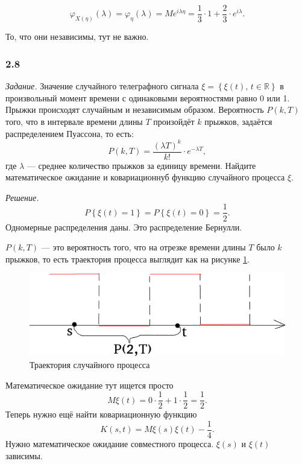 $$ \varphi_{X \left( \eta \right) } \left( \lambda \right) =
  \varphi_{ \eta } \left( \lambda \right) =
  Me^{i \lambda \eta } =
  \frac{1}{3} \cdot 1 + \frac{2}{3} \cdot e^{i \lambda }.$$

То, что они независимы, тут не важно.

\subsubsection*{2.8}

\textit{Задание.}
Значение случайного телеграфного сигнала
$ \xi = \left\{ \xi \left( t \right) , \,
  t \in \mathbb{R} \right\} $
в произвольный момент времени с одинаковыми вероятностями равно 0 или 1.
Прыжки происходят случайным и независимым образом.
Вероятность $P \left( k, T \right) $ того, что в интервале времени длины $T$ произойдёт $k$ прыжков,
задаётся распределением Пуассона, то есть:
$$P \left( k, T \right) =
  \frac{ \left( \lambda T \right)^k}{k!} \cdot e^{-\lambda T},$$
где $ \lambda $ --- среднее количество прыжков за единицу времени.
Найдите математическое ожидание и ковариационнуб функцию случайного процесса $ \xi $.

\textit{Решение.}
$$P \left\{ \xi \left( t \right) = 1 \right\} =
  P \left\{ \xi \left( t \right) = 0 \right\} =
  \frac{1}{2}.$$
Одномерные распределения даны.
Это распределение Бернулли.

$P \left( k, T \right) $ --- это вероятность того,
что на отрезке времени длины $T$ было $k$ прыжков,
то есть траектория процесса выглядит как на рисунке \ref{fig:28}.

\begin{figure}[h!]
 \centering
 \includegraphics[width=.5\textwidth]{./pictures/2_8.png}
 \caption{Траектория случайного процесса}
 \label{fig:28}
\end{figure}

Математическое ожидание тут ищется просто
$$M \xi \left( t \right) =
  0 \cdot \frac{1}{2} + 1 \cdot \frac{1}{2} =
  \frac{1}{2}.$$
Теперь нужно ещё найти ковариационную функцию
$$K \left( s, t \right) =
  M \xi \left( s \right) \xi \left( t \right) - \frac{1}{4}.$$
Нужно математическое ожидание совместного процесса.
$ \xi \left( s \right) $ и $ \xi \left( t \right) $ зависимы.

